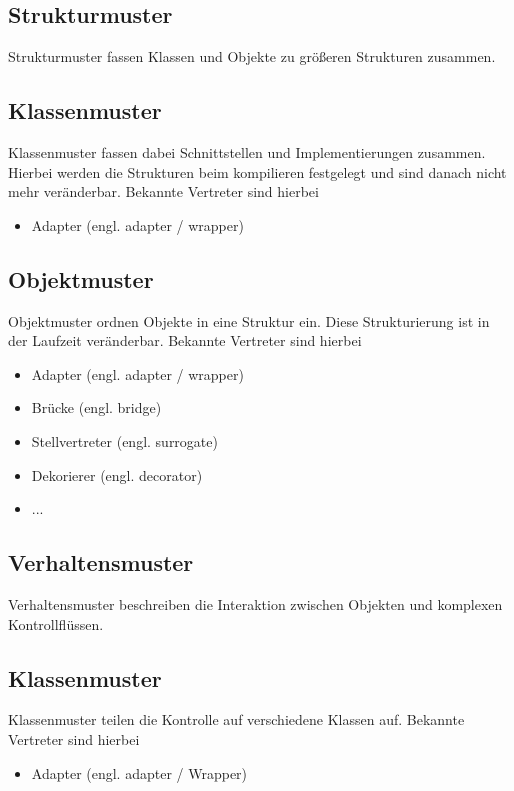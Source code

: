 		\subsection{Strukturmuster}
		Strukturmuster fassen Klassen und Objekte zu größeren Strukturen zusammen.
			
			\subsection{Klassenmuster}
			Klassenmuster fassen dabei Schnittstellen und Implementierungen zusammen. Hierbei werden die Strukturen beim kompilieren festgelegt und sind danach nicht mehr veränderbar. Bekannte Vertreter sind hierbei
			\begin{itemize}
				\item Adapter (engl. adapter / wrapper)
			\end{itemize}
			
			\subsection{Objektmuster}
			Objektmuster ordnen Objekte in eine Struktur ein. Diese Strukturierung ist in der Laufzeit veränderbar. Bekannte Vertreter sind hierbei
			\begin{itemize}
				\item Adapter (engl. adapter / wrapper)
				\item Brücke (engl. bridge)
				\item Stellvertreter (engl. surrogate)
				\item Dekorierer (engl. decorator)
				\item ...
			\end{itemize}
		
		\subsection{Verhaltensmuster}
		Verhaltensmuster beschreiben die Interaktion zwischen Objekten und komplexen Kontrollflüssen.
			\subsection{Klassenmuster}
			Klassenmuster teilen die Kontrolle auf verschiedene Klassen auf. Bekannte Vertreter sind hierbei
			\begin{itemize}
				\item Adapter (engl. adapter / Wrapper)
			\end{itemize}
			
